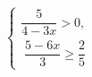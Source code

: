 \begin{ex}[type=ineq_system]
	\begin{condition}
		$\begin{cases} \dfrac{5}{4 - 3x}>0 ,\\
			\; \dfrac{5 - 6x}{3}\geqslant\dfrac{2}{5}  
		\end{cases}$
	\end{condition}
	\answer{$ \left(-\infty;\dfrac{19}{30}\right]  $}
\end{ex}